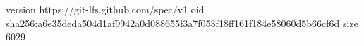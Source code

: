 version https://git-lfs.github.com/spec/v1
oid sha256:a6e35deda504d1af9942a0d088655f3a7f053f18ff161f184e58060d5b66cf6d
size 6029
